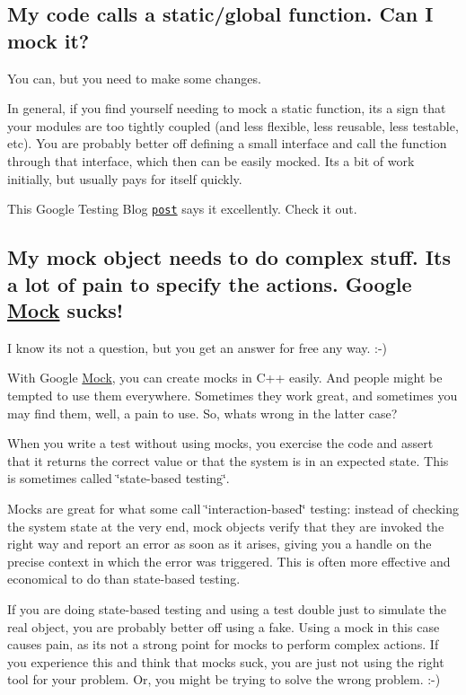 \subsection*{My code calls a static/global function. Can I mock it?}

You can, but you need to make some changes.

In general, if you find yourself needing to mock a static function, it\textquotesingle{}s a sign that your modules are too tightly coupled (and less flexible, less reusable, less testable, etc). You are probably better off defining a small interface and call the function through that interface, which then can be easily mocked. It\textquotesingle{}s a bit of work initially, but usually pays for itself quickly.

This Google Testing Blog \href{https://testing.googleblog.com/2008/06/defeat-static-cling.html}{\tt post} says it excellently. Check it out.

\subsection*{My mock object needs to do complex stuff. It\textquotesingle{}s a lot of pain to specify the actions. Google \hyperlink{classMock}{Mock} sucks!}

I know it\textquotesingle{}s not a question, but you get an answer for free any way. \+:-\/)

With Google \hyperlink{classMock}{Mock}, you can create mocks in C++ easily. And people might be tempted to use them everywhere. Sometimes they work great, and sometimes you may find them, well, a pain to use. So, what\textquotesingle{}s wrong in the latter case?

When you write a test without using mocks, you exercise the code and assert that it returns the correct value or that the system is in an expected state. This is sometimes called \char`\"{}state-\/based testing\char`\"{}.

Mocks are great for what some call \char`\"{}interaction-\/based\char`\"{} testing\+: instead of checking the system state at the very end, mock objects verify that they are invoked the right way and report an error as soon as it arises, giving you a handle on the precise context in which the error was triggered. This is often more effective and economical to do than state-\/based testing.

If you are doing state-\/based testing and using a test double just to simulate the real object, you are probably better off using a fake. Using a mock in this case causes pain, as it\textquotesingle{}s not a strong point for mocks to perform complex actions. If you experience this and think that mocks suck, you are just not using the right tool for your problem. Or, you might be trying to solve the wrong problem. \+:-\/)

